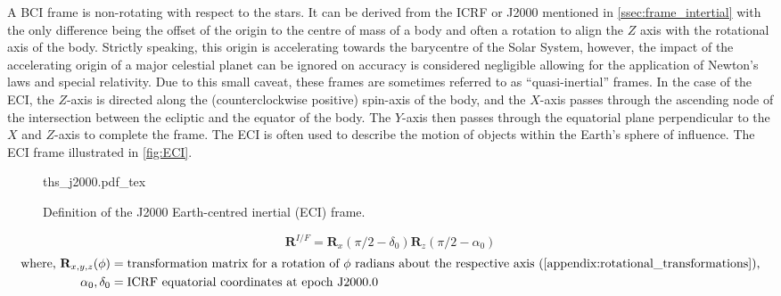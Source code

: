 A \Gls{BCI} frame is non-rotating with respect to the stars. It can be derived from the \gls{ICRF} or J2000 mentioned in \autoref{ssec:frame_intertial} with the only difference being the offset of the origin to the centre of mass of a body and often a rotation to align the $Z$ axis with the rotational axis of the body. Strictly speaking, this origin is accelerating towards the barycentre of the Solar System, however, the impact of the accelerating origin of a major celestial planet can be ignored on accuracy is considered negligible allowing for the application of Newton's laws and special relativity. Due to this small caveat, these frames are sometimes referred to as ``quasi-inertial'' frames. In the case of the \gls{ECI}, the $Z$-axis is directed along the (counterclockwise positive) spin-axis of the body, and the $X$-axis passes through the ascending node of the intersection between the ecliptic and the equator of the body. The $Y$-axis then passes through the equatorial plane perpendicular to the $X$ and $Z$-axis to complete the frame. The \gls{ECI} is often used to describe the motion of objects within the Earth's sphere of influence. The \gls{ECI} frame illustrated in \autoref{fig:ECI}.

\begin{figure}[H]
    \centering
    \def\svgwidth{0.72\linewidth}
    {ths_j2000.pdf_tex}
    \caption{Definition of the J2000 Earth-centred inertial (ECI) frame.}
    \label{fig:ECI}
\end{figure}

\begin{equation}
    \mathbf{R}^{I/F}=\mathbf{R}_x(\pi/2-\delta_0)\mathbf{R}_z(\pi/2-\alpha_0)
    \label{eq:bci_transformation}
\end{equation}
\begin{equation*}
    \begin{aligned}
        \textrm{where, }
        \mathbf{R}_{x,y,z}(\phi) & = \textrm{transformation matrix for a rotation of $\phi$ radians about the respective axis (\autoref{appendix:rotational_transformations}),} \\
        \alpha_0, \delta_0       & = \textrm{ICRF equatorial coordinates at epoch J2000.0}                                                                                      \\
    \end{aligned}
\end{equation*}

